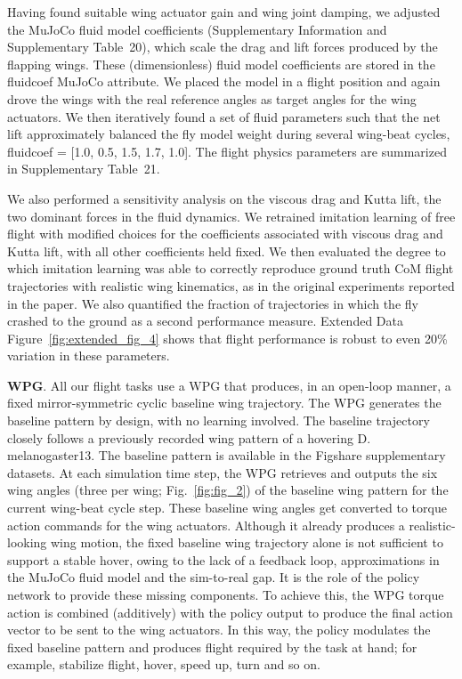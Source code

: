 \documentclass[sn-mathphys-num]{sn-jnl}%
\theoremstyle{thmstyleone}%
\theoremstyle{thmstyletwo}%
\theoremstyle{thmstylethree}%
\begin{document}
Having found suitable wing actuator gain and wing joint damping, we adjusted the MuJoCo fluid model coefficients (Supplementary Information and Supplementary Table 20), which scale the drag and lift forces produced by the flapping wings. 
These (dimensionless) fluid model coefficients are stored in the fluidcoef MuJoCo attribute. 
We placed the model in a flight position and again drove the wings with the real reference angles as target angles for the wing actuators. 
We then iteratively found a set of fluid parameters such that the net lift approximately balanced the fly model weight during several wing-beat cycles, fluidcoef = [1.0, 0.5, 1.5, 1.7, 1.0].
The flight physics parameters are summarized in Supplementary Table 21.


We also performed a sensitivity analysis on the viscous drag and Kutta lift, the two dominant forces in the fluid dynamics. 
We retrained imitation learning of free flight with modified choices for the coefficients associated with viscous drag and Kutta lift, with all other coefficients held fixed. 
We then evaluated the degree to which imitation learning was able to correctly reproduce ground truth CoM flight trajectories with realistic wing kinematics, as in the original experiments reported in the paper. 
We also quantified the fraction of trajectories in which the fly crashed to the ground as a second performance measure. 
Extended Data Figure~\ref{fig:extended_fig_4} shows that flight performance is robust to even 20\% variation in these parameters.


\textbf{WPG}. 
All our flight tasks use a WPG that produces, in an open-loop manner, a fixed mirror-symmetric cyclic baseline wing trajectory. 
The WPG generates the baseline pattern by design, with no learning involved. 
The baseline trajectory closely follows a previously recorded wing pattern of a hovering D. melanogaster13. 
The baseline pattern is available in the Figshare supplementary datasets\cite{vaxenburg2025whole}. 
At each simulation time step, the WPG retrieves and outputs the six wing angles (three per wing; Fig.~\ref{fig:fig_2}) of the baseline wing pattern for the current wing-beat cycle step. 
These baseline wing angles get converted to torque action commands for the wing actuators. 
Although it already produces a realistic-looking wing motion, the fixed baseline wing trajectory alone is not sufficient to support a stable hover, owing to the lack of a feedback loop, approximations in the MuJoCo fluid model and the sim-to-real gap. 
It is the role of the policy network to provide these missing components. 
To achieve this, the WPG torque action is combined (additively) with the policy output to produce the final action vector to be sent to the wing actuators. 
In this way, the policy modulates the fixed baseline pattern and produces flight required by the task at hand; 
for example, stabilize flight, hover, speed up, turn and so on.
\end{document}

